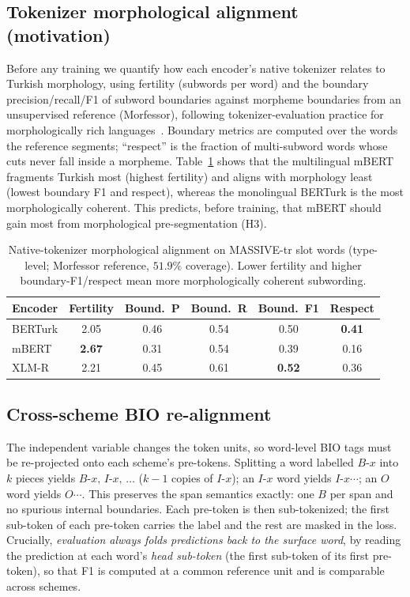 \documentclass[runningheads]{llncs}
\begin{document}
\subsection{Tokenizer morphological alignment (motivation)}
\label{sec:tok}
Before any training we quantify how each encoder's native tokenizer relates to
Turkish morphology, using fertility (subwords per word) and the boundary
precision/recall/F1 of subword boundaries against morpheme boundaries from an
unsupervised reference (Morfessor), following tokenizer-evaluation practice for
morphologically rich languages~\cite{tokalign70,toraman2022}. Boundary metrics
are computed over the words the reference segments; ``respect'' is the fraction
of multi-subword words whose cuts never fall inside a morpheme.
Table~\ref{tab:tok} shows that the multilingual mBERT fragments Turkish most
(highest fertility) and aligns with morphology least (lowest boundary F1 and
respect), whereas the monolingual BERTurk is the most morphologically coherent.
This predicts, before training, that mBERT should gain most from morphological
pre-segmentation (H3).

\begin{table}[t]
\centering
\caption{Native-tokenizer morphological alignment on MASSIVE-tr slot words
(type-level; Morfessor reference, $51.9\%$ coverage). Lower fertility and higher
boundary-F1/respect mean more morphologically coherent subwording.}
\label{tab:tok}
\begin{tabular}{lccccc}
\toprule
Encoder & Fertility & Bound.\ P & Bound.\ R & Bound.\ F1 & Respect \\
\midrule
BERTurk & 2.05 & 0.46 & 0.54 & 0.50 & \textbf{0.41} \\
mBERT   & \textbf{2.67} & 0.31 & 0.54 & 0.39 & 0.16 \\
XLM-R   & 2.21 & 0.45 & 0.61 & \textbf{0.52} & 0.36 \\
\bottomrule
\end{tabular}
\end{table}

\subsection{Cross-scheme BIO re-alignment}
The independent variable changes the token units, so word-level BIO tags must be
re-projected onto each scheme's pre-tokens. Splitting a word labelled $B$-$x$ into
$k$ pieces yields $B$-$x,\,I$-$x,\,\dots$ ($k{-}1$ copies of $I$-$x$); an $I$-$x$
word yields $I$-$x\cdots$; an $O$ word yields $O\cdots$. This preserves the span
semantics exactly: one $B$ per span and no spurious internal boundaries. Each
pre-token is then sub-tokenized; the first sub-token of each pre-token carries the
label and the rest are masked in the loss. Crucially, \emph{evaluation always
folds predictions back to the surface word}, by reading the prediction at each
word's \emph{head sub-token} (the first sub-token of its first pre-token), so that
F1 is computed at a common reference unit and is comparable across schemes.
\end{document}
